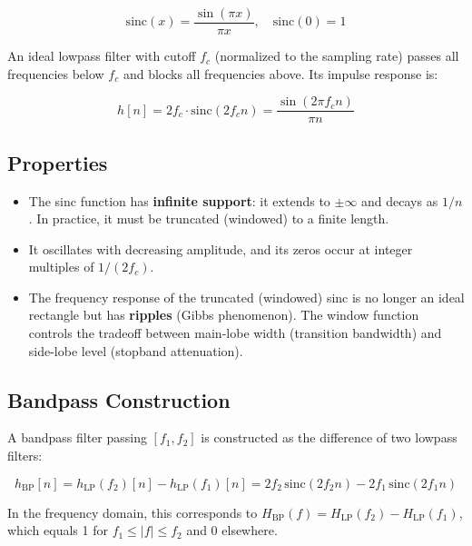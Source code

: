\documentclass[12pt]{report}
\begin{document}
\begin{equation}
    \text{sinc}(x) = \frac{\sin(\pi x)}{\pi x}, \quad \text{sinc}(0) = 1
\end{equation}

An ideal lowpass filter with cutoff $f_c$ (normalized to the sampling rate) passes all
frequencies below $f_c$ and blocks all frequencies above. Its impulse response is:

\begin{equation}
    h[n] = 2f_c \cdot \text{sinc}(2f_c n) = \frac{\sin(2\pi f_c n)}{\pi n}
\end{equation}

\subsection{Properties}

\begin{itemize}
    \item The sinc function has \textbf{infinite support}: it extends to $\pm\infty$ and
          decays as $1/n$. In practice, it must be truncated (windowed) to a finite length.
    \item It oscillates with decreasing amplitude, and its zeros occur at integer multiples
          of $1/(2f_c)$.
    \item The frequency response of the truncated (windowed) sinc is no longer an ideal
          rectangle but has \textbf{ripples} (Gibbs phenomenon). The window function controls
          the tradeoff between main-lobe width (transition bandwidth) and side-lobe level
          (stopband attenuation).
\end{itemize}

\subsection{Bandpass Construction}

A bandpass filter passing $[f_1, f_2]$ is constructed as the difference of two lowpass filters:

\begin{equation}
    h_\text{BP}[n] = h_\text{LP}(f_2)[n] - h_\text{LP}(f_1)[n]
                   = 2f_2 \,\text{sinc}(2f_2 n) - 2f_1 \,\text{sinc}(2f_1 n)
\end{equation}

In the frequency domain, this corresponds to $H_\text{BP}(f) = H_\text{LP}(f_2) - H_\text{LP}(f_1)$,
which equals 1 for $f_1 \leq |f| \leq f_2$ and 0 elsewhere.
\end{document}
